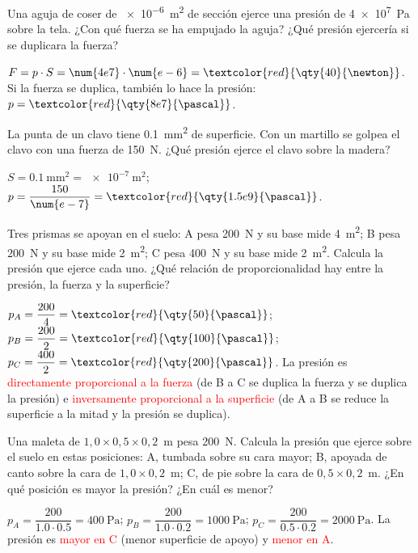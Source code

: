 \begin{exercise}
    Una aguja de coser de \qty{e-6}{\square\m} de sección ejerce una presión de \qty{4e7}{\pascal} sobre la tela. ¿Con qué fuerza se ha empujado la aguja? ¿Qué presión ejercería si se duplicara la fuerza?
    \begin{solu}
        \(F = p \cdot S = \num{4e7} \cdot \num{e-6} = \textcolor{red}{\qty{40}{\newton}}\). Si la fuerza se duplica, también lo hace la presión: \(p = \textcolor{red}{\qty{8e7}{\pascal}}\).
    \end{solu}
\end{exercise}

\begin{exercise}
    La punta de un clavo tiene \qty{0.1}{\square\mm} de superficie. Con un martillo se golpea el clavo con una fuerza de \qty{150}{\newton}. ¿Qué presión ejerce el clavo sobre la madera?
    \begin{solu}
        \(S = \qty{0.1}{\square\mm} = \qty{e-7}{\square\m}\); \(p = \dfrac{150}{\num{e-7}} = \textcolor{red}{\qty{1.5e9}{\pascal}}\).
    \end{solu}
\end{exercise}

\begin{exercise}
    Tres prismas se apoyan en el suelo: A pesa \qty{200}{\newton} y su base mide \qty{4}{\square\m}; B pesa \qty{200}{\newton} y su base mide \qty{2}{\square\m}; C pesa \qty{400}{\newton} y su base mide \qty{2}{\square\m}. Calcula la presión que ejerce cada uno. ¿Qué relación de proporcionalidad hay entre la presión, la fuerza y la superficie?
    \begin{solu}
        \(p_A = \dfrac{200}{4} = \textcolor{red}{\qty{50}{\pascal}}\); \(p_B = \dfrac{200}{2} = \textcolor{red}{\qty{100}{\pascal}}\); \(p_C = \dfrac{400}{2} = \textcolor{red}{\qty{200}{\pascal}}\).
        La presión es \textcolor{red}{directamente proporcional a la fuerza} (de B a C se duplica la fuerza y se duplica la presión) e \textcolor{red}{inversamente proporcional a la superficie} (de A a B se reduce la superficie a la mitad y la presión se duplica).
    \end{solu}
\end{exercise}

\begin{exercise}
    Una maleta de \(1{,}0 \times 0{,}5 \times 0{,}2\)~\unit{\m} pesa \qty{200}{\newton}. Calcula la presión que ejerce sobre el suelo en estas posiciones: A, tumbada sobre su cara mayor; B, apoyada de canto sobre la cara de \(1{,}0 \times 0{,}2\)~\unit{\m}; C, de pie sobre la cara de \(0{,}5 \times 0{,}2\)~\unit{\m}. ¿En qué posición es mayor la presión? ¿En cuál es menor?
    \begin{solu}
        \(p_A = \dfrac{200}{\num{1.0} \cdot \num{0.5}} = \qty{400}{\pascal}\); \(p_B = \dfrac{200}{\num{1.0} \cdot \num{0.2}} = \qty{1000}{\pascal}\); \(p_C = \dfrac{200}{\num{0.5} \cdot \num{0.2}} = \qty{2000}{\pascal}\).
        La presión es \textcolor{red}{mayor en C} (menor superficie de apoyo) y \textcolor{red}{menor en A}.
    \end{solu}
\end{exercise}

